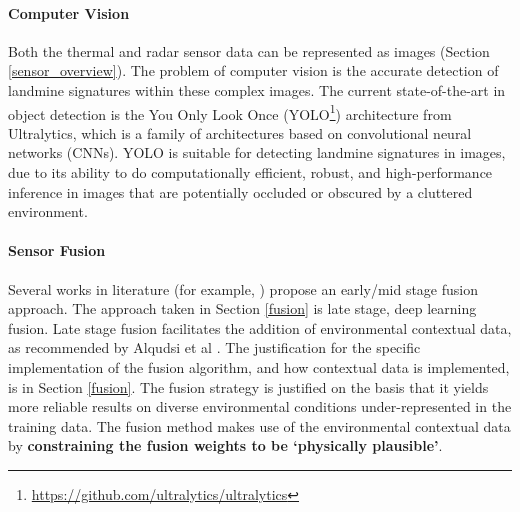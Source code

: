     \paragraph{Computer Vision} 

        Both the thermal and radar sensor data can be represented as images (Section \ref{sensor_overview}). The problem of computer vision is the accurate detection of landmine signatures within these complex images. The current state-of-the-art in object detection is the You Only Look Once (YOLO\footnote{\url{https://github.com/ultralytics/ultralytics}}) architecture from Ultralytics, which is a family of architectures based on convolutional neural networks (CNNs). YOLO is suitable for detecting landmine signatures in images, due to its ability to do computationally efficient, robust, and high-performance inference in images that are potentially occluded or obscured by a cluttered environment.
    
    \paragraph{Sensor Fusion} 
    
        \noindent Several works in literature (for example, \cite{qui2023fusion}) propose an early/mid stage fusion approach. The approach taken in Section \ref{fusion} is late stage, deep learning fusion. Late stage fusion facilitates the addition of environmental contextual data, as recommended by Alqudsi et al \cite{alqudsi2021review}. The justification for the specific implementation of the fusion algorithm, and how contextual data is implemented, is in Section \ref{fusion}. The fusion strategy is justified on the basis that it yields more reliable results on diverse environmental conditions under-represented in the training data. The fusion method makes use of the environmental contextual data by \textbf{constraining the fusion weights to be `physically plausible'}.
    


